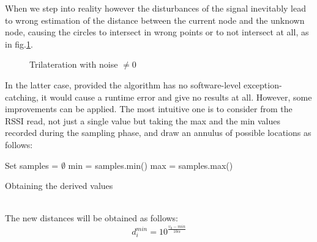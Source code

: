 \documentclass[12pt]{report}
\begin{document}
When we step into reality however the disturbances of the signal inevitably lead to wrong estimation of the distance between the current node and the unknown node, causing the circles to intersect in wrong points or to not intersect at all, as in fig.\ref{fig:trilKO}.
\begin{figure}
    \centering
    \caption{Trilateration with noise $\neq0$}
    \label{fig:trilKO}
\end{figure}
In the latter case, provided the algorithm has no software-level exception-catching, it would cause a runtime error and give no results at all. However, some improvements can be applied. The most intuitive one is to consider from the RSSI read, not just a single value but taking the max and the min values recorded during the sampling phase, and draw an annulus of possible locations as follows:
\begin{algorithm}[H]
\SetAlgoLined
{}
 Set samples = $\emptyset$\;
 min = samples.min()\;
 max = samples.max()\;
 \caption{Obtaining the derived values}
\end{algorithm}
\noindent\\The new distances will be obtained as follows:
\begin{equation}
    d_i^{min}=10^{\frac{\upsilon_0-min}{10\alpha}}    
\end{equation}
\end{document}
